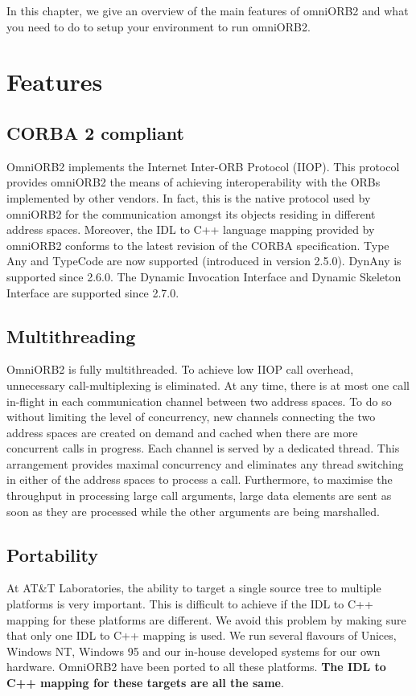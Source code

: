\documentclass[11pt,twoside,onecolumn]{book}
\begin{document}
In this chapter, we give an overview of the main features of omniORB2 and
what you need to do to setup your environment to run omniORB2.

\section{Features}

\subsection{CORBA 2 compliant}

OmniORB2 implements the Internet Inter-ORB Protocol (IIOP).
This protocol provides omniORB2 the means of achieving interoperability
with the ORBs implemented by other vendors. In fact, this is the
native protocol used by omniORB2 for the communication amongst its objects
residing in different address spaces. Moreover, the IDL to C++ language
mapping provided by omniORB2 conforms to the latest revision of the CORBA
specification. Type Any and TypeCode are now supported (introduced in version
2.5.0). DynAny is supported since 2.6.0. The Dynamic Invocation Interface
and Dynamic Skeleton Interface are supported since 2.7.0.

\subsection{Multithreading}

OmniORB2 is fully multithreaded. To achieve low IIOP call overhead,
unnecessary call-multiplexing is eliminated. At any time, there is at most
one call in-flight in each communication channel between two address
spaces. To do so without limiting the level of concurrency, new channels
connecting the two address spaces are created on demand and cached when
there are more concurrent calls in progress. Each channel is served by a
dedicated thread. This arrangement provides maximal concurrency and
eliminates any thread switching in either of the address spaces to process
a call. Furthermore, to maximise the throughput in processing large call
arguments, large data elements are sent as soon as they are processed while
the other arguments are being marshalled.

\subsection{Portability}

At AT\&T Laboratories, the ability to target a single source tree to
multiple platforms is
very important. This is difficult to achieve if the IDL to C++ mapping for
these platforms are different. We avoid this problem by making sure that
only one IDL to C++ mapping is used. We run several flavours of Unices, Windows
NT, Windows 95 and our in-house developed systems for our own
hardware. OmniORB2 have been ported to all these platforms. {\bf The IDL to
C++ mapping for these targets are all the same}.
\end{document}
